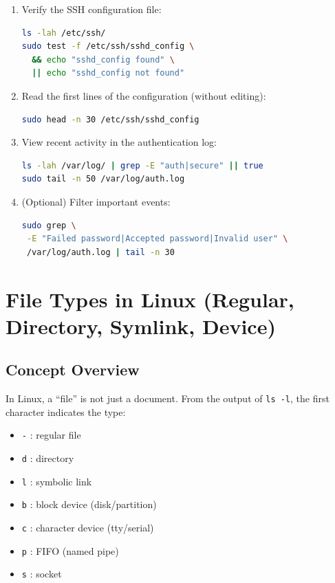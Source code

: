 \begin{enumerate}
    \item Verify the SSH configuration file:
\begin{lstlisting}[language=bash, caption={Checking the SSH configuration}]
ls -lah /etc/ssh/
sudo test -f /etc/ssh/sshd_config \
  && echo "sshd_config found" \
  || echo "sshd_config not found"
\end{lstlisting}

    \item Read the first lines of the configuration (without editing):
\begin{lstlisting}[language=bash, caption={Reading configuration safely}]
sudo head -n 30 /etc/ssh/sshd_config
\end{lstlisting}

    \item View recent activity in the authentication log:
\begin{lstlisting}[language=bash, caption={Viewing the authentication log}]
ls -lah /var/log/ | grep -E "auth|secure" || true
sudo tail -n 50 /var/log/auth.log
\end{lstlisting}

    \item (Optional) Filter important events:
\begin{lstlisting}[language=bash, caption={Filtering important events in auth.log}]
sudo grep \
 -E "Failed password|Accepted password|Invalid user" \
 /var/log/auth.log | tail -n 30
\end{lstlisting}
\end{enumerate}

\section{File Types in Linux (Regular, Directory, Symlink, Device)}
\label{sec:filetypes}

\subsection*{Concept Overview}
In Linux, a ``file'' is not just a document. From the output of \texttt{ls -l},
the first character indicates the type:
\begin{itemize}
    \item \texttt{-} : regular file
    \item \texttt{d} : directory
    \item \texttt{l} : symbolic link
    \item \texttt{b} : block device (disk/partition)
    \item \texttt{c} : character device (tty/serial)
    \item \texttt{p} : FIFO (named pipe)
    \item \texttt{s} : socket
\end{itemize}


